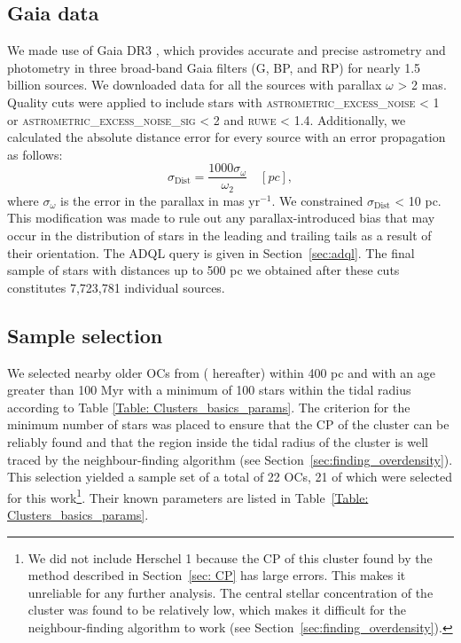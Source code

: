 \documentclass{aa}
\begin{document}
\subsection{Gaia data} \label{Sec:Gaia_Data}
We made use of Gaia DR3 \citep{Gaia2023A&A...674A...1G}, which provides accurate and precise astrometry and photometry in three broad-band Gaia filters (G, BP, and RP) for nearly 1.5 billion sources. We downloaded data for all the sources with parallax $\omega$ > 2 mas. Quality cuts were applied to include stars with \textsc{astrometric\_excess\_noise} < 1 or  \textsc{astrometric\_excess\_noise\_sig} < 2 and \textsc{ruwe} < 1.4. Additionally, we calculated the absolute distance error for every source with an error propagation as follows:
\begin{equation}\label{eq:Dist_err}
\sigma_{\text{Dist}} = \frac{1000\sigma_{\omega}}{\omega_{2}} \quad [pc],
\end{equation}
where $\sigma_{\omega}$ is the error in the parallax in mas yr$^{-1}$. 
We constrained $\sigma_{\text{Dist}}$ < 10 pc. This modification was made to rule out any parallax-introduced bias that may occur in the distribution of stars in the leading and trailing tails as a result of their orientation. The ADQL query is given in Section~\ref{sec:adql}. The final sample of stars with distances up to 500 pc we obtained after these cuts constitutes 7,723,781 individual sources.

\subsection{Sample selection}

We selected nearby older OCs from \citet{2024arXiv240305143H} ( hereafter) within 400 pc and with an age greater than 100 Myr with a minimum of 100 stars within the tidal radius according to Table \ref{Table: Clusters_basics_params}. The criterion for the minimum number of stars was placed to ensure that the CP of the cluster can be reliably found and that the region inside the tidal radius of the cluster is well traced by the neighbour-finding algorithm (see Section~\ref{sec:finding_overdensity}). This selection yielded a sample set of a total of 22 OCs, 21 of which were selected for this work\footnote{We did not include  
Herschel 1 because the CP of this cluster found by the method described in Section~\ref{sec: CP} has large errors. This makes it unreliable for any further analysis. The central stellar concentration of the cluster was found to be relatively low, which makes it difficult for the neighbour-finding algorithm to work (see Section~\ref{sec:finding_overdensity}).}. 
Their known parameters are listed in Table~\ref{Table: Clusters_basics_params}.  
\end{document}
